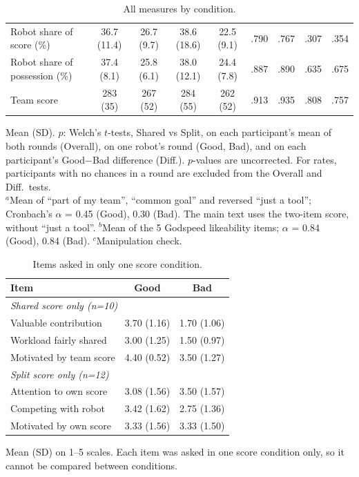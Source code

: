 \begin{table}[H]
\begin{tabular}{lcccc|cccc}
Robot share of score (\%) & 36.7 (11.4) & 26.7 (9.7) & 38.6 (18.6) & 22.5 (9.1) & .790 & .767 & .307 & .354 \\
Robot share of possession (\%) & 37.4 (8.1) & 25.8 (6.1) & 38.0 (12.1) & 24.4 (7.8) & .887 & .890 & .635 & .675 \\
Team score & 283 (35) & 267 (52) & 284 (55) & 262 (52) & .913 & .935 & .808 & .757 \\
\bottomrule
\end{tabular}
\par\smallskip\raggedright\scriptsize
Mean (SD). $p$: Welch's $t$-tests, Shared vs Split, on each participant's mean of both rounds (Overall), on one robot's round (Good, Bad), and on each participant's Good$-$Bad difference (Diff.). $p$-values are uncorrected. For rates, participants with no chances in a round are excluded from the Overall and Diff.\ tests.\\
$^{a}$Mean of ``part of my team'', ``common goal'' and reversed ``just a tool''; Cronbach's $\alpha$ = 0.45 (Good), 0.30 (Bad). The main text uses the two-item score, without ``just a tool''. $^{b}$Mean of the 5 Godspeed likeability items; $\alpha$ = 0.84 (Good), 0.84 (Bad). $^{c}$Manipulation check.
\caption{All measures by condition.}
\label{tab:results_full}
\end{table}

\begin{table}[H]
\centering
\footnotesize
\begin{tabular}{lcc}
\toprule
\textbf{Item} & \textbf{Good} & \textbf{Bad} \\
\midrule
\multicolumn{3}{l}{\textit{Shared score only (n=10)}} \\
Valuable contribution & 3.70 (1.16) & 1.70 (1.06) \\
Workload fairly shared & 3.00 (1.25) & 1.50 (0.97) \\
Motivated by team score & 4.40 (0.52) & 3.50 (1.27) \\
\multicolumn{3}{l}{\textit{Split score only (n=12)}} \\
Attention to own score & 3.08 (1.56) & 3.50 (1.57) \\
Competing with robot & 3.42 (1.62) & 2.75 (1.36) \\
Motivated by own score & 3.33 (1.56) & 3.33 (1.50) \\
\bottomrule
\end{tabular}
\par\smallskip\raggedright\scriptsize Mean (SD) on 1--5 scales. Each item was asked in one score condition only, so it cannot be compared between conditions.
\caption{Items asked in only one score condition.}
\label{tab:condition_items}
\end{table}

